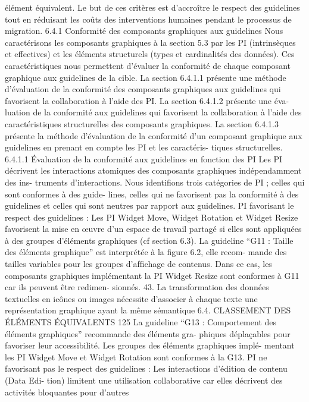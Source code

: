 \documentclass{article}
\begin{document}
élément équivalent. Le but de ces critères est d’accroître le respect des guidelines tout en réduisant les
coûts des interventions humaines pendant le processus de migration.
6.4.1
Conformité des composants graphiques aux guidelines
Nous caractérisons les composants graphiques à la section 5.3 par les PI (intrinsèques et effectives)
et les éléments structurels (types et cardinalités des données). Ces caractéristiques nous permettent
d’évaluer la conformité de chaque composant graphique aux guidelines de la cible.
La section 6.4.1.1 présente une méthode d’évaluation de la conformité des composants graphiques
aux guidelines qui favorisent la collaboration à l’aide des PI. La section 6.4.1.2 présente une éva-
luation de la conformité aux guidelines qui favorisent la collaboration à l’aide des caractéristiques
structurelles des composants graphiques. La section 6.4.1.3 présente la méthode d’évaluation de la
conformité d’un composant graphique aux guidelines en prenant en compte les PI et les caractéris-
tiques structurelles.
6.4.1.1
Évaluation de la conformité aux guidelines en fonction des PI
Les PI décrivent les interactions atomiques des composants graphiques indépendamment des ins-
truments d’interactions. Nous identiﬁons trois catégories de PI ; celles qui sont conformes à des guide-
lines, celles qui ne favorisent pas la conformité à des guidelines et celles qui sont neutres par rapport
aux guidelines.
PI favorisant le respect des guidelines :
Les PI Widget Move, Widget Rotation et Widget Resize
favorisent la mise en œuvre d’un espace de travail partagé si elles sont appliquées à des groupes
d’éléments graphiques (cf section 6.3).
La guideline “G11 : Taille des éléments graphique” est interprétée à la ﬁgure 6.2, elle recom-
mande des tailles variables pour les groupes d’afﬁchage de contenus. Dans ce cas, les composants
graphiques implémentant la PI Widget Resize sont conformes à G11 car ils peuvent être redimen-
sionnés.
43. La transformation des données textuelles en icônes ou images nécessite d’associer à chaque texte une représentation
graphique ayant la même sémantique
6.4. CLASSEMENT DES ÉLÉMENTS ÉQUIVALENTS
125
La guideline “G13 : Comportement des éléments graphiques” recommande des éléments gra-
phiques déplaçables pour favoriser leur accessibilité. Les groupes des éléments graphiques implé-
mentant les PI Widget Move et Widget Rotation sont conformes à la G13.
PI ne favorisant pas le respect des guidelines :
Les interactions d’édition de contenu (Data Edi-
tion) limitent une utilisation collaborative car elles décrivent des activités bloquantes pour d’autres
\end{document}
